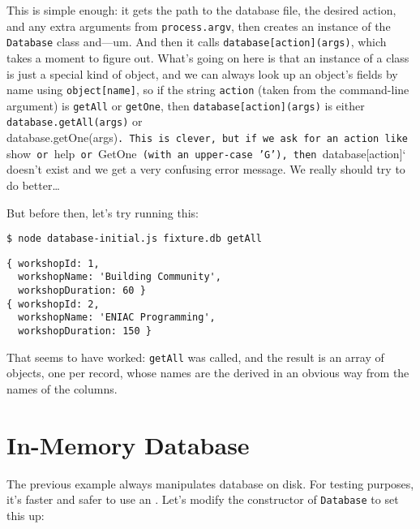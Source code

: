 This is simple enough:
it gets the path to the database file,
the desired action,
and any extra arguments from \texttt{process.argv},
then creates an instance of the \texttt{Database} class and---um.
And then it calls \texttt{database{[}action{]}(args)},
which takes a moment to figure out.
What's going on here is that an instance of a class is just a special kind of object,
and we can always look up an object's fields by name using \texttt{object{[}name{]}},
so if the string \texttt{action} (taken from the command-line argument) is \texttt{getAll} or \texttt{getOne},
then \texttt{database{[}action{]}(args)} is either \texttt{database.getAll(args)} or database.getOne(args)\texttt{.\ This\ is\ clever,\ but\ if\ we\ ask\ for\ an\ action\ like\ }show\texttt{\ or\ }help\texttt{\ or\ }GetOne\texttt{\ (with\ an\ upper-case\ 'G'),\ then\ }database{[}action{]}` doesn't exist and we get a very confusing error message.
We really should try to do better\ldots{}

But before then,
let's try running this:

\begin{verbatim}
$ node database-initial.js fixture.db getAll
\end{verbatim}

\begin{verbatim}
{ workshopId: 1,
  workshopName: 'Building Community',
  workshopDuration: 60 }
{ workshopId: 2,
  workshopName: 'ENIAC Programming',
  workshopDuration: 150 }
\end{verbatim}

That seems to have worked:
\texttt{getAll} was called,
and the result is an array of objects,
one per record,
whose names are the derived in an obvious way from the names of the columns.

\section{In-Memory Database}\label{s:db-in-memory}

The previous example always manipulates database on disk.
For testing purposes,
it's faster and safer to use an .
Let's modify the constructor of \texttt{Database} to set this up:

